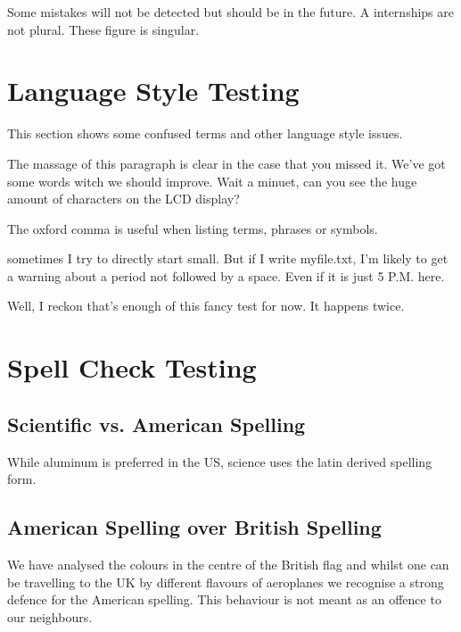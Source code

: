 \documentclass{scrartcl}
\begin{document}
Some mistakes will not be detected but should be in the future.
A internships are not plural. These figure is singular.






\section{Language Style Testing}
This section shows some confused terms and other language style issues.

The massage of this paragraph is clear in the case that you missed it. We've got some words witch we should improve.
Wait a minuet, can you see the huge amount of characters on the LCD display? 

The oxford comma is useful when listing terms, phrases or symbols.

sometimes I try to directly start small. But if I write myfile.txt, I'm likely to get a warning about a period not followed by a space. Even if it is just 5 P.M. here.

Well, I reckon that's enough of this fancy test for now. It happens twice. 



\section{Spell Check Testing}

\subsection{Scientific vs. American Spelling}
While aluminum is preferred in the US, science uses the latin derived spelling form.


\subsection{American Spelling over British Spelling}
We have analysed the 
colours in the 
centre of the British flag 
and whilst one can 
be travelling to the UK 
by different flavours
of aeroplanes we 
recognise a strong
defence for the American spelling.
This behaviour is 
not meant as an offence to
our neighbours.
\end{document}
